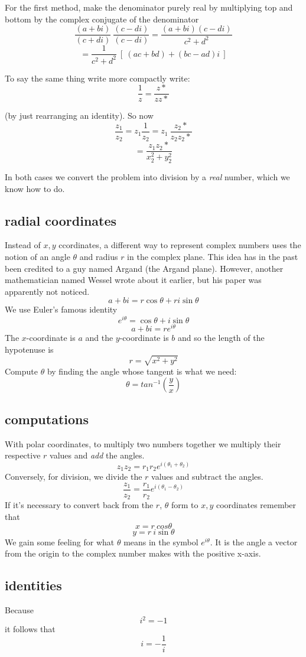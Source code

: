 \documentclass[11pt, oneside]{article}   	%
\begin{document}
For the first method, make the denominator purely real by multiplying top and bottom by the complex conjugate of the denominator
\[
\frac{(a + bi)}{(c + di)} \ \frac{(c - di)}{(c - di)} = \frac{(a + bi)(c - di)}{c^2 + d^2} \]
\[ =  \frac{1}{c^2 + d^2} \ [ \ (ac + bd) + (bc-ad)i \ ] \]

To say the same thing write more compactly write:
\[ \frac{1}{z} = \frac{z*}{z z*} \]

(by just rearranging an identity).  So now
\[ \frac{z_1}{z_2} = z_1 \frac{1}{z_2} =  z_1 \ \frac{z_2*}{z_2 z_2*} \]
\[ = \frac{z_1 z_2*}{x_2^2 + y_2^2} \]

In both cases we convert the problem into division by a \emph{real} number, which we know how to do.

\subsection*{radial coordinates}
Instead of $x,y$ ccordinates, a different way to represent complex numbers uses the notion of an angle $\theta$ and radius $r$ in the complex plane.  This idea has in the past been credited to a guy named Argand (the Argand plane).  However, another mathematician named Wessel wrote about it earlier, but his paper was apparently not noticed.
\[ a + bi = r \cos \theta + r i \sin \theta \]
We use Euler's famous identity
\[ e^{i\theta} = \cos \theta + i \sin \theta \]
\[ a + bi = r e^{i\theta} \]
The $x$-coordinate is $a$ and the $y$-coordinate is $b$ and so the length of the hypotenuse is 
\[ r = \sqrt{x^2 + y^2} \]
Compute $\theta$ by finding the angle whose tangent is what we need:
\[ \theta = tan^{-1} (\frac{y}{x}) \]

\subsection*{computations}
With polar coordinates, to multiply two numbers together we multiply their respective $r$ values and \emph{add} the angles.\[
z_1 z_2 = r_1 r_2 e^{i(\theta_1 + \theta_2)} \]
Conversely, for division, we divide the $r$ values and subtract the angles.
\[ \frac{z_1}{z_2} =\frac{r_1}{r_2} e^{i(\theta_1 - \theta_2)} \]
If it's necessary to convert back from the $r$, $\theta$ form to $x,y$ coordinates remember that
\[ x = r \  cos \theta \]
\[ y = r \  i \sin \theta \]
We gain some feeling for what $\theta$ means in the symbol $e^{i\theta}$.  It is the angle a vector from the origin to the complex number makes with the positive x-axis.
\subsection*{identities}
Because
\[ i^2 = -1 \]
it follows that 
\[ i = -\frac{1}{i} \]
\end{document}

